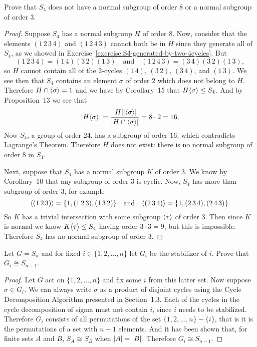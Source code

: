  Prove that $S_4$ does not have a normal subgroup of
order $8$ or a normal subgroup of order $3$.
\begin{proof}
  Suppose $S_4$ has a normal subgroup $H$ of order $8$. Now, consider
  that the elements $(1\,2\,3\,4)$ and $(1\,2\,4\,3)$ cannot both be
  in $H$ since they generate all of $S_4$, as we showed in
  Exercise~\ref{exercise:S4-generated-by-two-4cycles}. But
  \begin{equation*}
    (1\,2\,3\,4) = (1\,4)(3\,2)(1\,3)
    \quad\text{and}\quad
    (1\,2\,4\,3) = (3\,4)(3\,2)(1\,3),
  \end{equation*}
  so $H$ cannot contain all of the $2$-cycles $(1\,4)$, $(3\,2)$,
  $(3\,4)$, and $(1\,3)$. We see then that $S_4$ contains an element
  $\sigma$ of order $2$ which does not belong to $H$. Therefore
  $H\cap\langle{\sigma}\rangle = 1$ and we have by Corollary~15 that
  $H\langle{\sigma}\rangle\leq S_4$. And by Proposition~13 we see that
  \begin{equation*}
    \lvert{H\langle{\sigma}\rangle}\rvert
    = \frac{\lvert{H}\rvert\lvert{\langle{\sigma}\rangle}\rvert}{\lvert{H\cap\langle{\sigma}\rangle}\rvert}
    = 8\cdot2 = 16.
  \end{equation*}
  Now $S_4$, a group of order $24$, has a subgroup of order $16$,
  which contradicts Lagrange's Theorem. Therefore $H$ does not exist:
  there is no normal subgroup of order $8$ in $S_4$.

  Next, suppose that $S_4$ has a normal subgroup $K$ of order $3$. We
  know by Corollary~10 that any subgroup of order $3$ is cyclic. Now,
  $S_4$ has more than subgroup of order $3$, for example
  \begin{equation*}
    \langle{(1\,2\,3)}\rangle = \{1, (1\,2\,3), (1\,3\,2)\}
    \quad\text{and}\quad
    \langle{(2\,3\,4)}\rangle = \{1, (2\,3\,4), (2\,4\,3)\}.
  \end{equation*}
  So $K$ has a trivial intersection with some subgroup $\langle{\tau}\rangle$ of
  order $3$. Then since $K$ is normal we know $K\langle{\tau}\rangle\leq S_4$
  having order $3\cdot3 = 9$, but this is impossible. Therefore $S_4$
  has no normal subgroup of order $3$.
\end{proof}

 Let $G = S_n$ and for fixed $i\in\{1,2,\dots,n\}$ let
$G_i$ be the stabilizer of $i$. Prove that $G_i\cong S_{n-1}$.
\begin{proof}
  Let $G$ act on $\{1,2,\dots,n\}$ and fix some $i$ from this latter
  set. Now suppose $\sigma\in G_i$. We can always write $\sigma$ as a
  product of disjoint cycles using the Cycle Decomposition Algorithm
  presented in Section~1.3. Each of the cycles in the cycle
  decomposition of sigma must not contain $i$, since $i$ needs to be
  stabilized. Therefore $G_i$ consists of all permutations of the set
  $\{1,2,\dots,n\} - \{i\}$, that is it is the permutations of a set
  with $n-1$ elements. And it has been shown that, for finite sets $A$
  and $B$, $S_A\cong S_B$ when $\lvert{A}\rvert = \lvert{B}\rvert$. Therefore
  $G_i\cong S_{n-1}$.
\end{proof}

